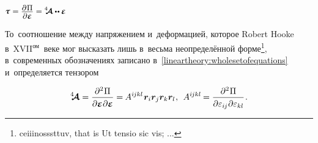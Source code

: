 \label{para:hookelaw}

\begin{otherlanguage}{russian}

\nopagebreak\vspace{-2.5em} ${\small \mathboldtau \hspace{0.1ex} = \displaystyle \frac{\raisemath{-0.2em}{\partial\hspace{0.1ex} \Pi}}{\raisemath{0.04em}{\partial \mathboldepsilon}} = \stiffnesstensor \dotdotp \mathboldepsilon}$ \nopagebreak\vspace{.55em}

\nopagebreak
То~соотношение между напряжением и~деформацией, которое Robert Hooke в~\hbox{XVII$^{\textrm{ом}}$\hspace{-0.12em}}~веке мог высказать лишь в~весьма неопределённой форме\footnote{ceiiinosssttuv, that is Ut tensio sic vis; ...}\hspace{-0.32em},\hspace{0.24em} в~современных обозначениях записано в~\eqref{lineartheory:wholesetofequations} и~определяется тензором

\nopagebreak\vspace{-0.1em}\begin{equation}
\stiffnesstensor =
\displaystyle \frac{\partial^2 \hspace{0.1ex} \Pi}{\raisemath{-0.1em}{\partial \mathboldepsilon \hspace{0.1ex} \partial \mathboldepsilon}} = \hspace{-0.1ex}
A^{i\hspace{-0.1ex}jkl} \hspace{.16ex} \bm{r}_i \bm{r}_j \bm{r}_k \bm{r}_l \hspace{0.1ex}, \:\:
%
A^{i\hspace{-0.1ex}jkl} \hspace{-0.16ex} =
\displaystyle \frac{\partial^2 \hspace{0.1ex} \Pi}{\raisemath{-0.1em}{\partial \varepsilon_{i\hspace{-0.1ex}j} \hspace{0.1ex} \partial \varepsilon_{kl}}} \hspace{0.16ex}.
\end{equation}


\end{otherlanguage}
